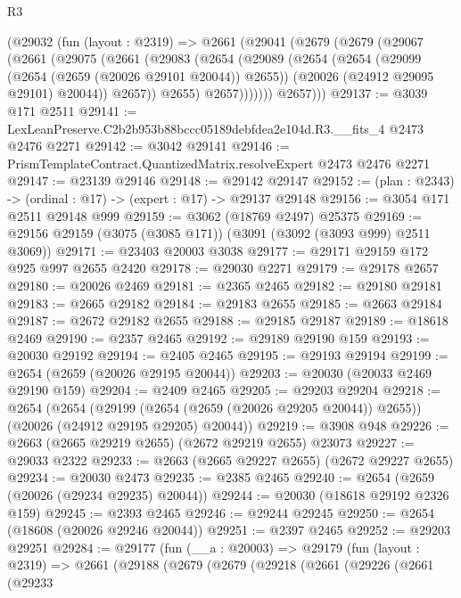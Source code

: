 \begin{lexlean}{R3}
\begin{coremodule}
    (@29032
      (fun (layout : @2319) =>
      @2661
        (@29041
          (@2679
            (@2679
              (@29067
                (@2661
                  (@29075
                    (@2661
                      (@29083
                        (@2654
                          (@29089
                            (@2654
                              (@2654
                                (@29099 (@2654 (@2659 (@20026 @29101 @20044)) @2655))
                                (@20026 (@24912 @29095 @29101) @20044))
                              @2657))
                          @2655)
                        @2657)))))))
          @2657)))
@29137 := @3039 @171 @2511
@29141 := LexLeanPreserve.C2b2b953b88bccc05189debfdea2e104d.R3.__fits_4 @2473 @2476 @2271
@29142 := @3042 @29141
@29146 := PrismTemplateContract.QuantizedMatrix.resolveExpert @2473 @2476 @2271
@29147 := @23139 @29146
@29148 := @29142 @29147
@29152 := (plan : @2343) -> (ordinal : @17) -> (expert : @17) -> @29137 @29148
@29156 := @3054 @171 @2511 @29148 @999
@29159 := @3062 (@18769 @2497) @25375
@29169 := @29156 @29159 (@3075 (@3085 @171)) (@3091 (@3092 (@3093 @999) @2511 @3069))
@29171 := @23403 @20003 @3038
@29177 := @29171 @29159 @172 @925 @997 @2655 @2420
@29178 := @29030 @2271
@29179 := @29178 @2657
@29180 := @20026 @2469
@29181 := @2365 @2465
@29182 := @29180 @29181
@29183 := @2665 @29182
@29184 := @29183 @2655
@29185 := @2663 @29184
@29187 := @2672 @29182 @2655
@29188 := @29185 @29187
@29189 := @18618 @2469
@29190 := @2357 @2465
@29192 := @29189 @29190 @159
@29193 := @20030 @29192
@29194 := @2405 @2465
@29195 := @29193 @29194
@29199 := @2654 (@2659 (@20026 @29195 @20044))
@29203 := @20030 (@20033 @2469 @29190 @159)
@29204 := @2409 @2465
@29205 := @29203 @29204
@29218 := @2654
    (@2654
      (@29199 (@2654 (@2659 (@20026 @29205 @20044)) @2655))
      (@20026 (@24912 @29195 @29205) @20044))
@29219 := @3908 @948
@29226 := @2663 (@2665 @29219 @2655) (@2672 @29219 @2655) @23073
@29227 := @29033 @2322
@29233 := @2663 (@2665 @29227 @2655) (@2672 @29227 @2655)
@29234 := @20030 @2473
@29235 := @2385 @2465
@29240 := @2654 (@2659 (@20026 (@29234 @29235) @20044))
@29244 := @20030 (@18618 @29192 @2326 @159)
@29245 := @2393 @2465
@29246 := @29244 @29245
@29250 := @2654 (@18608 (@20026 @29246 @20044))
@29251 := @2397 @2465
@29252 := @29203 @29251
@29284 := @29177
    (fun (__a : @20003) =>
    @29179
      (fun (layout : @2319) =>
      @2661
        (@29188
          (@2679
            (@2679
              (@29218
                (@2661
                  (@29226
                    (@2661
                      (@29233

\end{coremodule}
\end{lexlean}

